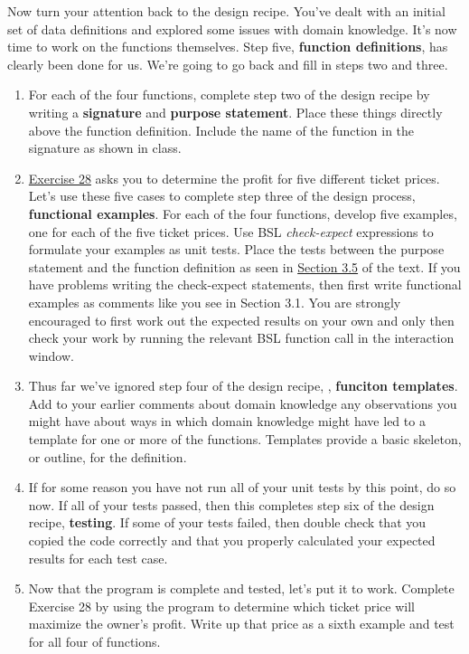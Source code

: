 \documentclass[nobib]{tufte-handout}
\begin{document}
Now turn your attention back to the design recipe. You've dealt with an initial set of data definitions and explored some issues with domain knowledge. It's now time to work on the functions themselves. Step five, \textbf{function definitions}, has clearly been done for us. We're going to go back and fill in steps two and three.

\begin{enumerate}[resume]
  \item For each of the four functions, complete step two of the design recipe by writing a \textbf{signature} and \textbf{purpose statement}. Place these things directly above the function definition. Include the name of the function in the signature as shown in class.

  \item  \href{http://htdp.org/2018-01-06/Book/part_one.html#%28counter._%28exercise._fun6%29%29}{Exercise 28} asks you to determine the profit for five different ticket prices. Let's use these five cases to complete step three of the design process,  \textbf{functional examples}. For each of the four functions, develop five examples, one for each of the five ticket prices. Use BSL \textit{check-expect} expressions to formulate your examples as unit tests. Place the tests between the purpose statement and the function definition as seen in \href{http://htdp.org/2018-01-06/Book/part_one.html#%28part._sec~3atesting%29}{Section 3.5} of the text. If you have problems writing the check-expect statements, then first write functional examples as comments like you see in Section 3.1. You are strongly encouraged to first work out the expected results on your own and only then check your work by running the relevant BSL function call in the interaction window\sidenote{Tests check to the see that a function does what its supposed to do not what it was programmed to do. These two things are not always the same}.

  \item Thus far we've ignored step four of the design recipe, , \textbf{funciton templates}. Add to your earlier comments about domain knowledge any observations you might have about ways in which domain knowledge might have led to a template for one or more of the functions.  Templates provide a basic skeleton, or outline, for the definition.

  \item If for some reason you have not run all of your unit tests by this point, do so now. If all of your tests passed, then this completes step six of the design recipe, \textbf{testing}. If some of your tests failed, then double check that you copied the code correctly and that you properly calculated your expected results for each test case.

  \item Now that the program is complete and tested, let's put it to work. Complete Exercise 28 by using the program to determine which ticket price will maximize the owner's profit. Write up that price as a sixth example and test for all four of functions.
\end{enumerate}
\end{document}
